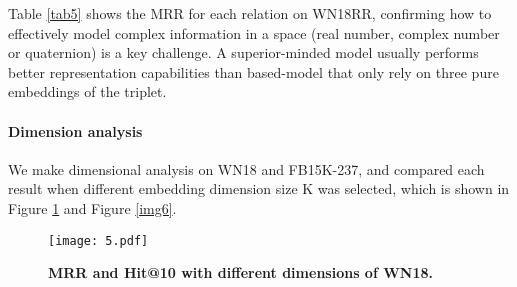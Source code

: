 \documentclass[letterpaper]{article} \usepackage{aaai20}  \usepackage{times}  \usepackage{helvet} \usepackage{courier}  \usepackage[hyphens]{url}  \usepackage{graphicx} \usepackage{lineno,hyperref,amsmath,amssymb}
\begin{document}
Table \ref{tab5} shows  the MRR for each relation on WN18RR, confirming how to effectively model complex information in a space (real number, complex number or quaternion) is a key challenge. A superior-minded model  usually performs better representation capabilities than based-model that only rely on three pure embeddings of the triplet.

\begin{table}[h]
    \centering
    \caption{\textbf{MRR of QuatE vs QuatDE}}
    \label{tab5}
    \end{table}

\paragraph{\textbf{Dimension analysis}}We make dimensional analysis on WN18 and FB15K-237, and compared each result when different embedding dimension size K was selected, which is shown in Figure \ref{img5} and Figure \ref{img6}.

\begin{figure}[ht]
\centering
\texttt{[image: 5.pdf]}
\caption{\textbf{MRR and Hit@10 with different dimensions of WN18.}}
\label{img5}
\end{figure}
\end{document}
